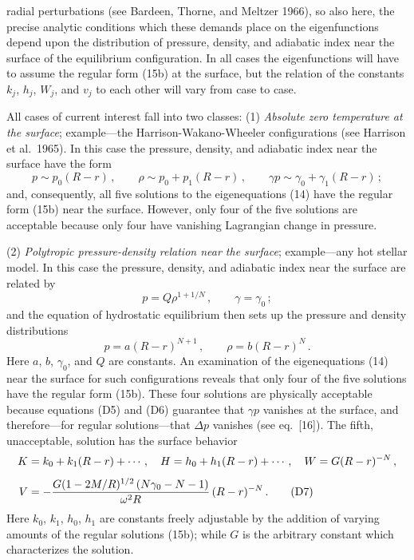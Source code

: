 
radial perturbations (see Bardeen, Thorne, and Meltzer 1966), so also here, the precise analytic
conditions which these demands place on the eigenfunctions depend upon the distribution of
pressure, density, and adiabatic index near the surface of the equilibrium configuration. In all
cases the eigenfunctions will have to assume the regular form (15b) at the surface, but the
relation of the constants $k_j$, $h_j$, $W_j$, and $v_j$ to each other will vary from case to case.

All cases of current interest fall into two classes: (1) \textit{Absolute zero temperature at the
surface}; example---the Harrison-Wakano-Wheeler configurations (see Harrison et al.\ 1965). In
this case the pressure, density, and adiabatic index near the surface have the form
%
\begin{equation}
p \sim p_0(R - r) \,, \qquad
\rho \sim p_0 + p_1(R - r) \,, \qquad
\gamma p \sim \gamma_0 + \gamma_1(R - r) \,;
\tag{D4}
\end{equation}
%
and, consequently, all five solutions to the eigenequations (14) have the regular form (15b) near
the surface. However, only four of the five solutions are acceptable because only four have
vanishing Lagrangian change in pressure.

(2) \textit{Polytropic pressure-density relation near the surface}; example---any hot stellar model.
In this case the pressure, density, and adiabatic index near the surface are related by
%
\begin{equation}
p = Q\rho^{1+1/N} \,, \qquad \gamma = \gamma_0 \,;
\tag{D5}
\end{equation}
%
and the equation of hydrostatic equilibrium then sets up the pressure and density distributions
%
\begin{equation}
p = a(R - r)^{N+1} \,, \qquad \rho = b(R - r)^N \,.
\tag{D6}
\end{equation}
%
Here $a$, $b$, $\gamma_0$, and $Q$ are constants. An examination of the eigenequations (14) near the
surface for such configurations reveals that only four of the five solutions have the regular form
(15b). These four solutions are physically acceptable because equations (D5) and (D6) guarantee
that $\gamma p$ vanishes at the surface, and therefore---for regular solutions---that $\Delta p$ vanishes
(see eq.\ [16]). The fifth, unacceptable, solution has the surface behavior
%
\begin{align}
K &= k_0 + k_1(R - r) + \cdots \,, \quad
H = h_0 + h_1(R - r) + \cdots \,, \quad
W = G(R - r)^{-N} \,, \notag \\[4pt]
V &= -\frac{G(1 - 2M/R)^{1/2}\,(N\gamma_0 - N - 1)}{\omega^2 R}\,(R - r)^{-N} \,.
\tag{D7}
\end{align}
%
Here $k_0$, $k_1$, $h_0$, $h_1$ are constants freely adjustable by the addition of varying amounts of
the regular solutions (15b); while $G$ is the arbitrary constant which characterizes the solution.

